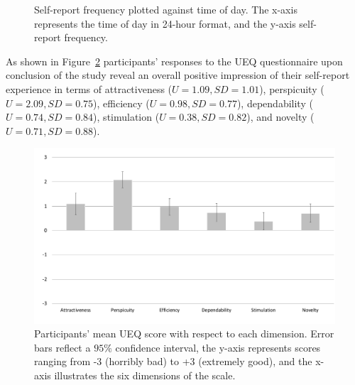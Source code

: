 \begin{figure}[h]
\begin{minipage}{.48\textwidth}
                    \caption{Self-report frequency plotted against time of day. The x-axis represents the time of day in 24-hour format, and the y-axis self-report frequency.}
                    \label{fig:time_frequency}
                \end{minipage}%
            \end{figure}  
            
        As shown in Figure~\ref{fig:ueq-ci} participants' responses to the \ac{UEQ} questionnaire upon conclusion of the study reveal an overall positive impression of their self-report experience in terms of 
                attractiveness  ($U = 1.09, SD = 1.01 $), 
                perspicuity     ($U = 2.09, SD = 0.75 $), 
                efficiency      ($U = 0.98, SD = 0.77 $), 
                dependability   ($U = 0.74, SD = 0.84 $), 
                stimulation     ($U = 0.38, SD = 0.82 $), 
                and 
                novelty         ($U = 0.71, SD = 0.88 $). 

            \begin{figure}
                \centering
                \includegraphics[width=\textwidth]{figures/ueq-ci.pdf}
                \caption{Participants' mean \ac{UEQ} score with respect to each dimension. Error bars reflect a $95\%$ confidence interval, the y-axis represents scores ranging from -3 (horribly bad) to +3 (extremely good), and the x-axis illustrates the six dimensions of the scale.}
                \label{fig:ueq-ci}
            \end{figure}
        
